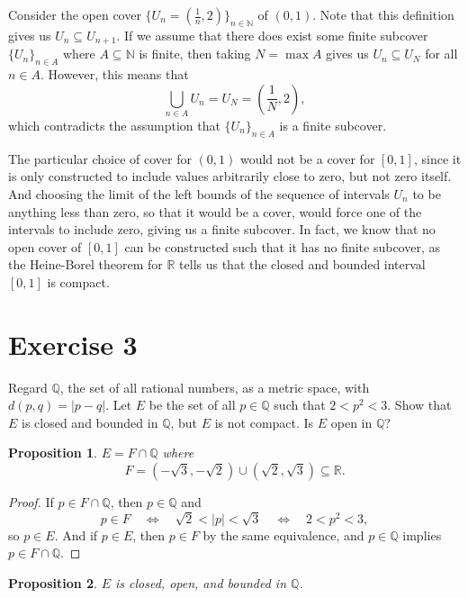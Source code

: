 \documentclass[12pt]{article}
\newtheorem{proposition}{Proposition}
\newenvironment{problem}
    {\begin{lrbox}{\mybox}\begin{minipage}{\textwidth-10pt}}
    {\end{minipage}\end{lrbox}\framebox[6.5in]{\usebox{\mybox}}}
\newcommand{\N}{\mathbb{N}}
\newcommand{\R}{\mathbb{R}}
\newcommand{\Q}{\mathbb{Q}}
\begin{document}
Consider the open cover $\{U_n=(\frac1n, 2)\}_{n\in\N}$ of $(0,1)$. Note that this definition gives us $U_n \subseteq U_{n+1}$. If we assume that there does exist some finite subcover $\{U_n\}_{n\in A}$ where $A\subseteq\N$ is finite, then taking $N=\max A$ gives us $U_n\subseteq U_N$ for all $n\in A$. However, this means that
\[\bigcup_{n\in A} U_n = U_N = \left(\frac1N,2\right),\]
which contradicts the assumption that $\{U_n\}_{n\in A}$ is a finite subcover.

The particular choice of cover for $(0,1)$ would not be a cover for $[0,1]$, since it is only constructed to include values arbitrarily close to zero, but not zero itself. And choosing the limit of the left bounds of the sequence of intervals $U_n$ to be anything less than zero, so that it would be a cover, would force one of the intervals to include zero, giving us a finite subcover. In fact, we know that no open cover of $[0,1]$ can be constructed such that it has no finite subcover, as the Heine-Borel theorem for $\R$ tells us that the closed and bounded interval $[0,1]$ is compact.

\newpage
\section*{Exercise 3}
\begin{problem}
    Regard $\mathbb{Q}$, the set of all rational numbers, as a metric space, with $d(p,q) = |p-q|$. Let $E$ be the set of all $p\in \mathbb{Q}$ such that $2<p^2<3$. Show that $E$ is closed and bounded in $\mathbb{Q}$, but $E$ is not compact. Is $E$ open in $\mathbb{Q}$?
\end{problem}

\begin{proposition}
    $E=F\cap\Q$ where
    \[F = (-\sqrt{3},-\sqrt{2})\cup(\sqrt{2},\sqrt{3}) \subseteq\R.\]
\end{proposition}

\begin{proof}
    If $p\in F\cap\Q$, then $p\in\Q$ and
    \[p\in F \quad\iff\quad \sqrt{2} < |p| < \sqrt{3} \quad\iff\quad 2<p^2<3,\]
    so $p\in E$. And if $p\in E$, then $p\in F$ by the same equivalence, and $p\in\Q$ implies $p\in F\cap\Q$.
    
\end{proof}

\begin{proposition}
    $E$ is closed, open, and bounded in $\mathbb{Q}$.
\end{proposition}
\end{document}
